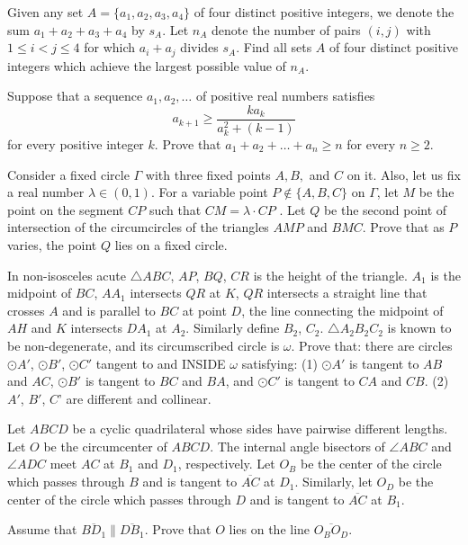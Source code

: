 \documentclass[11pt]{scrartcl}
\begin{document}
\begin{problem}[6405240413257919216]
	Given any set $A = \{a_1, a_2, a_3, a_4\}$ of four distinct positive integers, we denote the sum $a_1 +a_2 +a_3 +a_4$ by $s_A$. Let $n_A$ denote the number of pairs $(i, j)$ with $1 \leq  i < j \leq 4$ for which $a_i +a_j$ divides $s_A$. Find all sets $A$ of four distinct positive integers which achieve the largest possible value of $n_A$.
\end{problem}
\begin{problem}[2650659158441459375]
	Suppose that a sequence $a_1,a_2,\ldots$ of positive real numbers satisfies\[a_{k+1}\geq\frac{ka_k}{a_k^2+(k-1)}\]for every positive integer $k$. Prove that $a_1+a_2+\ldots+a_n\geq n$ for every $n\geq2$.
\end{problem}
\begin{problem}[5204026586393077531]
	Consider a fixed circle $\Gamma$ with three fixed points $A, B,$ and $C$ on it. Also, let us fix a real number $\lambda \in(0,1)$. For a variable point $P \not\in\{A, B, C\}$ on $\Gamma$, let $M$ be the point on the segment $CP$ such that $CM =\lambda\cdot  CP$ . Let $Q$ be the second point of intersection of the circumcircles of the triangles $AMP$ and $BMC$. Prove that as $P$ varies, the point $Q$ lies on a fixed circle.
\end{problem}
\begin{problem}[1293772592063302344]
In non-isosceles acute ${}{\triangle ABC}$, $AP$, $BQ$, $CR$ is the height of the triangle. $A_1$ is the midpoint of $BC$, $AA_1$ intersects $QR$ at $K$, $QR$ intersects a straight line that crosses ${A}$ and is parallel to $BC$ at point ${D}$, the line connecting the midpoint of $AH$ and ${K}$ intersects $DA_1$ at $A_2$. Similarly define $B_2$, $C_2$. ${}\triangle A_2B_2C_2$ is known to be non-degenerate, and its circumscribed circle is $\omega$. Prove that: there are circles $\odot A'$, $\odot B'$, $\odot C'$ tangent to and INSIDE $\omega$ satisfying:
(1) $\odot A'$ is tangent to $AB$ and $AC$, $\odot B'$ is tangent to $BC$ and $BA$, and $\odot C'$ is tangent to $CA$ and $CB$.
(2) $A'$, $B'$, $C$' are different and collinear.
\end{problem}
\begin{problem}[6025085618534905645]
	Let $ABCD$ be a cyclic quadrilateral whose sides have pairwise different lengths. Let $O$ be the circumcenter of $ABCD$. The internal angle bisectors of $\angle ABC$ and $\angle ADC$ meet $AC$ at $B_1$ and $D_1$, respectively. Let $O_B$ be the center of the circle which passes through $B$ and is tangent to $\overline{AC}$ at $D_1$. Similarly, let $O_D$ be the center of the circle which passes through $D$ and is tangent to $\overline{AC}$ at $B_1$.

Assume that $\overline{BD_1} \parallel \overline{DB_1}$. Prove that $O$ lies on the line $\overline{O_BO_D}$.
\end{problem}
\end{document}
